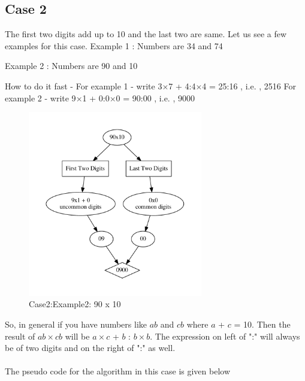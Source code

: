 \documentclass[a4paper,10pt]{article}
\begin{document}
\subsection{Case 2} \label{caseb}
The first two digits add up to 10 and the last two are same.
\newline
Let us see a few examples for this case.
\newline
Example 1 : Numbers are 34 and 74
\begin{center}
\qquad
\end{center}
Example 2 : Numbers are 90 and 10
\begin{center}
\qquad
\end{center}
How to do it fast - \newline
For example 1 - write 3$\times$7 + 4:4$\times$4 = 25:16 , i.e. , 2516 \newline
For example 2 - write 9$\times$1 + 0:0$\times$0 = 90:00 , i.e. , 9000 \newline
\begin{figure}
    \centering
    \includegraphics[width=0.68\textwidth]{figure1.pdf}
    \caption{Case2:Example2: 90 x 10 }
    \label{fig:my_label1}
\end{figure}
So, in general if you have numbers like $ab$ and $cb$ where $a$ + $c$ = 10. Then the result of $ab \times cb$ will be $a\times c $ + $b$ : $b \times b$. The expression on left of ":" will always be of two digits and on the right of ":" as well. \\ \\
The pseudo code for the algorithm in this case is given below
\end{document}

